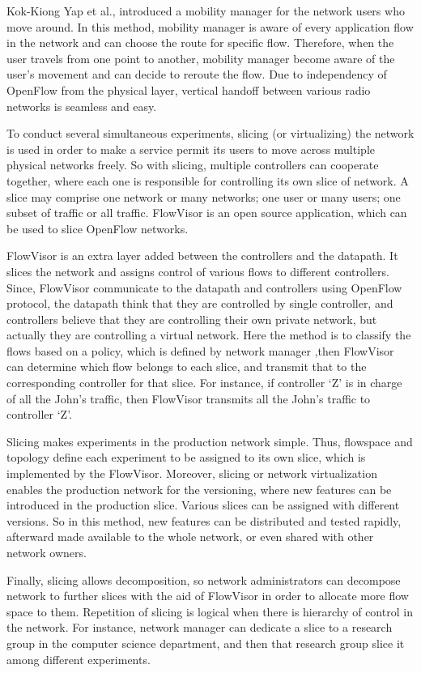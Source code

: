 Kok-Kiong Yap et al., introduced a mobility manager for the network users who move around. In this method, mobility manager is aware of every application flow in the network and can choose the route for specific flow. Therefore, when the user travels from one point to another, mobility manager become aware of the user’s movement and can decide to reroute the flow. Due to independency of OpenFlow from the physical layer, vertical handoff between various radio networks is seamless and easy. 

To conduct several simultaneous experiments, slicing (or virtualizing) the network is used in order to make a service permit its users to move across multiple physical networks freely. So with slicing, multiple controllers can cooperate together, where each one is responsible for controlling its own slice of network. A slice may comprise one network or many networks; one user or many users; one subset of traffic or all traffic. FlowVisor is an open source application, which can be used to slice OpenFlow networks. 

FlowVisor is an extra layer added between the controllers and the datapath. It slices the network and assigns control of various flows to different controllers. Since, FlowVisor communicate to the datapath and controllers using OpenFlow protocol, the datapath think that they are controlled by single controller, and controllers believe that they are controlling their own private network, but actually they are controlling a virtual network. Here the method is to classify the flows based on a policy, which is defined by network manager ,then FlowVisor can determine which flow belongs to each slice, and transmit that to the corresponding controller for that slice. For instance, if controller ‘Z’ is in charge of all the John’s traffic, then FlowVisor transmits all the John’s traffic to controller ‘Z’. 

Slicing makes experiments in the production network simple. Thus, flowspace and topology define each experiment to be assigned to its own slice, which is implemented by the FlowVisor. Moreover, slicing or network virtualization enables the production network for the versioning, where new features can be introduced in the production slice. Various slices can be assigned with different versions. So in this method, new features can be distributed and tested rapidly, afterward made available to the whole network, or even shared with other network owners. 

Finally, slicing allows decomposition, so network administrators can decompose network to further slices with the aid of FlowVisor in order to allocate more flow space to them. Repetition of slicing is logical when there is hierarchy of control in the network. For instance, network manager can dedicate a slice to a research group in the computer science department, and then that research group slice it among different experiments. 

